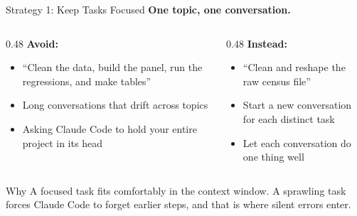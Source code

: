 \documentclass[aspectratio=169, 11pt]{beamer}
\begin{document}
\begin{frame}{Strategy 1: Keep Tasks Focused}
  \centering
  {\large \textbf{One topic, one conversation.}}

  \vspace{1em}
  \begin{columns}[T]
    \begin{column}{0.48\textwidth}
      \textbf{\color{red!70!black} Avoid:}
      \begin{itemize}
        \item ``Clean the data, build the panel, run the regressions, and make tables''
        \item Long conversations that drift across topics
        \item Asking Claude Code to hold your entire project in its head
      \end{itemize}
    \end{column}
    \begin{column}{0.48\textwidth}
      \textbf{\color{green!50!black} Instead:}
      \begin{itemize}
        \item ``Clean and reshape the raw census file''
        \item Start a new conversation for each distinct task
        \item Let each conversation do one thing well
      \end{itemize}
    \end{column}
  \end{columns}

  \vspace{0.8em}
  \begin{alertblock}{Why}
    A focused task fits comfortably in the context window. A sprawling task forces Claude Code to forget earlier steps, and that is where silent errors enter.
  \end{alertblock}
\end{frame}
\end{document}
